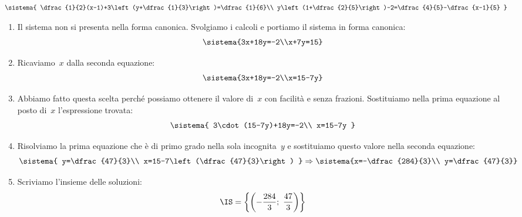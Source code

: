 \begin{esempio}
\(\sistema{
  \dfrac{1}{2}(x-1)+3\left(y+\dfrac{1}{3}\right)=\dfrac{1}{6}\\
  y\left(1+\dfrac{2}{5}\right)-2=\dfrac{4}{5}-\dfrac{x-1}{5}
  }\)

\begin{enumerate}
 \item Il sistema non si presenta nella forma canonica. Svolgiamo i calcoli e 
portiamo il sistema in forma canonica:
\[\sistema{3x+18y=-2\\x+7y=15}\]

\item Ricaviamo~\(x\) dalla seconda equazione:
\[\sistema{3x+18y=-2\\x=15-7y}\]

\item Abbiamo fatto questa scelta perché possiamo ottenere il valore di~\(x\)
con facilità e senza frazioni. Sostituiamo nella prima equazione al posto 
di~\(x\)
l'espressione trovata:
\[\sistema{
          3\cdot(15-7y)+18y=-2\\
          x=15-7y
          }
\]
\item Risolviamo la prima equazione che è di primo grado nella sola
incognita~\(y\) e sostituiamo questo valore nella seconda equazione:
\[\sistema{
          y=\dfrac{47}{3}\\
          x=15-7\left(\dfrac{47}{3}\right)
          }
\Rightarrow \sistema{x=-\dfrac{284}{3}\\
 y=\dfrac{47}{3}}\]
\item Scriviamo l'insieme delle soluzioni:
\[\IS=\left\{\left(-\frac{284}{3};~\frac{47}{3}\right)\right\}\]
\end{enumerate}

 \end{esempio}
% 
% 
